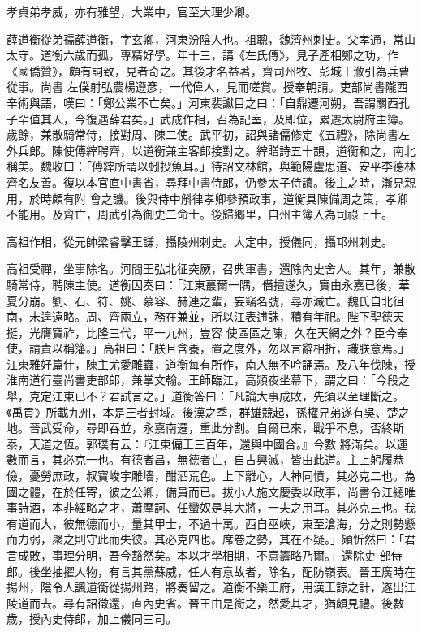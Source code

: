 \begin{pinyinscope}
 孝貞弟孝威，亦有雅望，大業中，官至大理少卿。



 薛道衡從弟孺薛道衡，字玄卿，河東汾陰人也。祖聰，魏濟州刺史。父孝通，常山太守。道衡六歲而孤，專精好學。年十三，講《左氏傳》，見子產相鄭之功，作《國僑贊》，頗有詞致，見者奇之。其後才名益著，齊司州牧、彭城王浟引為兵曹從事。尚書
 左僕射弘農楊遵彥，一代偉人，見而嗟賞。授奉朝請。吏部尚書隴西辛術與語，嘆曰：「鄭公業不亡矣。」河東裴讞目之曰：「自鼎遷河朔，吾謂關西孔子罕值其人，今復遇薛君矣。」武成作相，召為記室，及即位，累遷太尉府主簿。歲餘，兼散騎常侍，接對周、陳二使。武平初，詔與諸儒修定《五禮》，除尚書左外兵郎。陳使傅縡聘齊，以道衡兼主客郎接對之。縡贈詩五十韻，道衡和之，南北稱美。魏收曰：「傅縡所謂以蚓投魚耳。」待詔文林館，與範陽盧思道、安平李德林齊名友善。復以本官直中書省，尋拜中書侍郎，仍參太子侍讀。後主之時，漸見親用，於時頗有附
 會之譏。後與侍中斛律孝卿參預政事，道衡具陳備周之策，孝卿不能用。及齊亡，周武引為御史二命士。後歸鄉里，自州主簿入為司祿上士。



 高祖作相，從元帥梁睿擊王謙，攝陵州刺史。大定中，授儀同，攝邛州刺史。



 高祖受禪，坐事除名。河間王弘北征突厥，召典軍書，還除內史舍人。其年，兼散騎常侍，聘陳主使。道衡因奏曰：「江東蕞爾一隅，僭擅遂久，實由永嘉已後，華夏分崩。劉、石、符、姚、慕容、赫連之輩，妄竊名號，尋亦滅亡。魏氏自北徂南，未遑遠略。周、齊兩立，務在兼並，所以江表逋誅，積有年祀。陛下聖德天挺，光膺寶祚，比隆三代，平一九州，豈容
 使區區之陳，久在天網之外？臣今奉使，請責以稱籓。」高祖曰：「朕且含養，置之度外，勿以言辭相折，識朕意焉。」江東雅好篇什，陳主尤愛雕蟲，道衡每有所作，南人無不吟誦焉。及八年伐陳，授淮南道行臺尚書吏部郎，兼掌文翰。王師臨江，高熲夜坐幕下，謂之曰：「今段之舉，克定江東已不？君試言之。」道衡答曰：「凡論大事成敗，先須以至理斷之。《禹貢》所載九州，本是王者封域。後漢之季，群雄競起，孫權兄弟遂有吳、楚之地。晉武受命，尋即吞並，永嘉南遷，重此分割。自爾已來，戰爭不息，否終斯泰，天道之恆。郭璞有云：『江東偏王三百年，還與中國合。』今數
 將滿矣。以運數而言，其必克一也。有德者昌，無德者亡，自古興滅，皆由此道。主上躬履恭儉，憂勞庶政，叔寶峻宇雕墻，酣酒荒色。上下離心，人神同憤，其必克二也。為國之體，在於任寄，彼之公卿，備員而已。拔小人施文慶委以政事，尚書令江總唯事詩酒，本非經略之才，蕭摩訶、任蠻奴是其大將，一夫之用耳。其必克三也。我有道而大，彼無德而小，量其甲士，不過十萬。西自巫峽，東至滄海，分之則勢懸而力弱，聚之則守此而失彼。其必克四也。席卷之勢，其在不疑。」熲忻然曰：「君言成敗，事理分明，吾今豁然矣。本以才學相期，不意籌略乃爾。」還除吏
 部侍郎。後坐抽擢人物，有言其黨蘇威，任人有意故者，除名，配防嶺表。晉王廣時在揚州，陰令人諷道衡從揚州路，將奏留之。道衡不樂王府，用漢王諒之計，遂出江陵道而去。尋有詔徵還，直內史省。晉王由是銜之，然愛其才，猶頗見禮。後數歲，授內史侍郎，加上儀同三司。




\end{pinyinscope}
